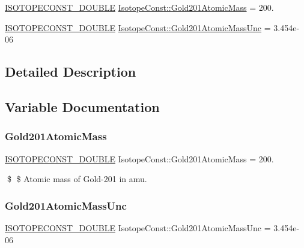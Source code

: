 \begin{DoxyCompactItemize}
\item 
\mbox{\hyperlink{group___isotope_const-_macros_ga8f45a7272ce02c0b4c65c44636ed719a}{I\+S\+O\+T\+O\+P\+E\+C\+O\+N\+S\+T\+\_\+\+D\+O\+U\+B\+LE}} \mbox{\hyperlink{group___isotope_const-_gold-_au201_ga5c09f8aed4613d2f1333b1d44d8a8009}{Isotope\+Const\+::\+Gold201\+Atomic\+Mass}} = 200.
\item 
\mbox{\hyperlink{group___isotope_const-_macros_ga8f45a7272ce02c0b4c65c44636ed719a}{I\+S\+O\+T\+O\+P\+E\+C\+O\+N\+S\+T\+\_\+\+D\+O\+U\+B\+LE}} \mbox{\hyperlink{group___isotope_const-_gold-_au201_gac775e3bf7f03845b3fff14e3fe9d9f0f}{Isotope\+Const\+::\+Gold201\+Atomic\+Mass\+Unc}} = 3.\+454e-\/06
\end{DoxyCompactItemize}


\subsection{Detailed Description}


\subsection{Variable Documentation}
\mbox{\label{group___isotope_const-_gold-_au201_ga5c09f8aed4613d2f1333b1d44d8a8009}} 
\subsubsection{\texorpdfstring{Gold201\+Atomic\+Mass}{Gold201AtomicMass}}
{\footnotesize\ttfamily \mbox{\hyperlink{group___isotope_const-_macros_ga8f45a7272ce02c0b4c65c44636ed719a}{I\+S\+O\+T\+O\+P\+E\+C\+O\+N\+S\+T\+\_\+\+D\+O\+U\+B\+LE}} Isotope\+Const\+::\+Gold201\+Atomic\+Mass = 200.}

\$ \$ Atomic mass of Gold-\/201 in amu. \mbox{\label{group___isotope_const-_gold-_au201_gac775e3bf7f03845b3fff14e3fe9d9f0f}} 
\subsubsection{\texorpdfstring{Gold201\+Atomic\+Mass\+Unc}{Gold201AtomicMassUnc}}
{\footnotesize\ttfamily \mbox{\hyperlink{group___isotope_const-_macros_ga8f45a7272ce02c0b4c65c44636ed719a}{I\+S\+O\+T\+O\+P\+E\+C\+O\+N\+S\+T\+\_\+\+D\+O\+U\+B\+LE}} Isotope\+Const\+::\+Gold201\+Atomic\+Mass\+Unc = 3.\+454e-\/06}

